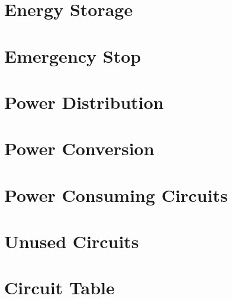\section{Energy Storage}

\section{Emergency Stop}

\section{Power Distribution}

\section{Power Conversion}

\section{Power Consuming Circuits}

\section{Unused Circuits}

\section{Circuit Table}




